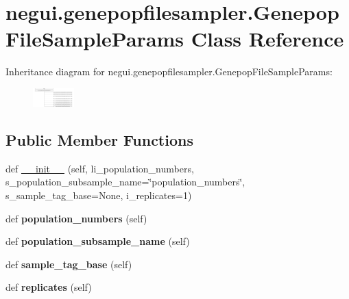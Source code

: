 \hypertarget{classnegui_1_1genepopfilesampler_1_1GenepopFileSampleParams}{}\section{negui.\+genepopfilesampler.\+Genepop\+File\+Sample\+Params Class Reference}
\label{classnegui_1_1genepopfilesampler_1_1GenepopFileSampleParams}
Inheritance diagram for negui.\+genepopfilesampler.\+Genepop\+File\+Sample\+Params\+:\begin{figure}[H]
\begin{center}
\leavevmode
\includegraphics[height=0.715884cm]{classnegui_1_1genepopfilesampler_1_1GenepopFileSampleParams}
\end{center}
\end{figure}
\subsection*{Public Member Functions}
\begin{DoxyCompactItemize}
\item 
def \hyperlink{classnegui_1_1genepopfilesampler_1_1GenepopFileSampleParams_a97adc62099fe8f021d4baa948551b970}{\+\_\+\+\_\+init\+\_\+\+\_\+} (self, li\+\_\+population\+\_\+numbers, s\+\_\+population\+\_\+subsample\+\_\+name=\char`\"{}population\+\_\+numbers\char`\"{}, s\+\_\+sample\+\_\+tag\+\_\+base=None, i\+\_\+replicates=1)
\item 
def {\bfseries population\+\_\+numbers} (self)\hypertarget{classnegui_1_1genepopfilesampler_1_1GenepopFileSampleParams_a5ecc667eef35a832923e5c4ce659cfe7}{}\label{classnegui_1_1genepopfilesampler_1_1GenepopFileSampleParams_a5ecc667eef35a832923e5c4ce659cfe7}

\item 
def {\bfseries population\+\_\+subsample\+\_\+name} (self)\hypertarget{classnegui_1_1genepopfilesampler_1_1GenepopFileSampleParams_ab3ae1c545edd5230e6c37db9507d0535}{}\label{classnegui_1_1genepopfilesampler_1_1GenepopFileSampleParams_ab3ae1c545edd5230e6c37db9507d0535}

\item 
def {\bfseries sample\+\_\+tag\+\_\+base} (self)\hypertarget{classnegui_1_1genepopfilesampler_1_1GenepopFileSampleParams_a943ad5572fa9623ea33b940286df2e3a}{}\label{classnegui_1_1genepopfilesampler_1_1GenepopFileSampleParams_a943ad5572fa9623ea33b940286df2e3a}

\item 
def {\bfseries replicates} (self)\hypertarget{classnegui_1_1genepopfilesampler_1_1GenepopFileSampleParams_aca3ce40cd559719396e4cadec36dfbd1}{}\label{classnegui_1_1genepopfilesampler_1_1GenepopFileSampleParams_aca3ce40cd559719396e4cadec36dfbd1}

\end{DoxyCompactItemize}


